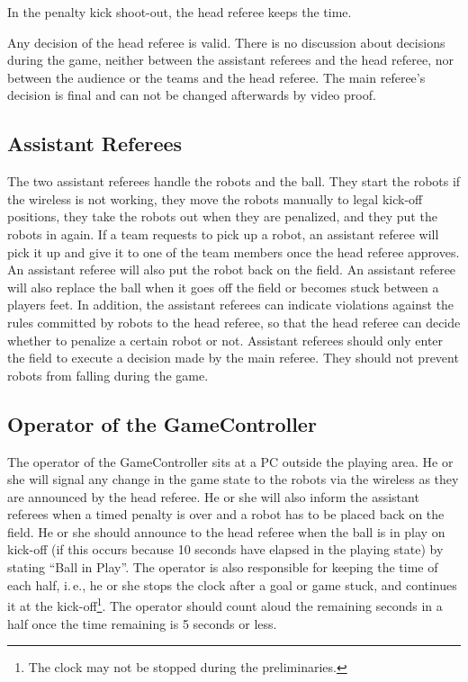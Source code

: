 \documentclass[12pt]{article}
\newcommand{\ie}{\mbox{i.\,e.}\xspace}
\begin{document}
In the penalty kick shoot-out, the head referee keeps the time.

Any decision of the head referee is valid. There is no discussion about decisions during the game, neither between the assistant referees and the head referee, nor between the audience or the teams and the head referee. The main referee's decision is final and can not be changed afterwards by video proof.

\subsection{Assistant Referees}
\label{sec:assist_referee}
The two assistant referees handle the robots and the ball. They start the robots if the wireless is not working, they move the robots manually to legal kick-off positions, they take the robots out when they are penalized, and they put the robots in again. If a team requests to pick up a robot, an assistant referee will pick it up and give it to one of the team members once the head referee approves. An assistant referee will also put the robot back on the field. An assistant referee will also replace the ball when it goes off the field or becomes stuck between a players feet.  In addition, the assistant referees can indicate violations against the rules committed by robots to the head referee, so that the head referee can decide whether to penalize a certain robot or not. Assistant referees should only enter the field to execute a decision made by the main referee. They should not prevent robots from falling during the game.

\subsection{Operator of the GameController}
\label{sec:gameControllerOp}
The operator of the GameController sits at a PC outside the playing area. He or she will signal any change in the game state to the robots via the wireless as they are announced by the head referee. He or she will also inform the assistant referees when a timed penalty is over and a robot has to be placed back on the field. He or she should announce to the head referee when the ball is in play on kick-off (if this occurs because 10 seconds have elapsed in the playing state) by stating ``Ball in Play''. The operator is also responsible for keeping the time of each half, \ie, he or she stops the clock after a goal or game stuck, and continues it at the kick-off\footnote{The clock may not be stopped during the preliminaries.}.  The operator should count aloud the remaining seconds in a half once the time remaining is 5 seconds or less.
\end{document}
